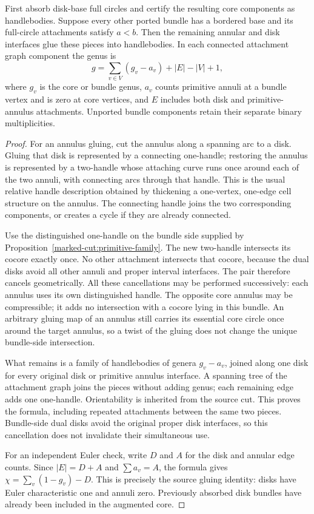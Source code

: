 \begin{proposition}
\label{marked-cut:primitive-census}
First absorb disk-base full circles and certify the resulting core
components as handlebodies. Suppose every other ported bundle has a bordered
base and its full-circle attachments satisfy $a<b$. Then the remaining
annular and disk interfaces glue these pieces into handlebodies. In each
connected attachment graph component the genus is
\[
 g=\sum_{v\in V}(g_v-a_v)+|E|-|V|+1,
\]
where $g_v$ is the core or bundle genus, $a_v$ counts primitive annuli at a
bundle vertex and is zero at core vertices, and $E$ includes both disk and
primitive-annulus attachments. Unported bundle components retain their
separate binary multiplicities.
\end{proposition}
\begin{proof}
For an annulus gluing, cut the annulus along a spanning arc to a disk.
Gluing that disk is represented by a connecting one-handle; restoring the
annulus is represented by a two-handle whose attaching curve runs once
around each of the two annuli, with connecting arcs through that handle.
This is the usual relative handle description obtained by thickening a
one-vertex, one-edge cell structure on the annulus. The connecting handle
joins the two corresponding components, or creates a cycle if they are
already connected.

Use the distinguished one-handle on the bundle side supplied by
Proposition~\ref{marked-cut:primitive-family}. The new two-handle intersects
its cocore exactly once. No other attachment intersects that cocore, because
the dual disks avoid all other annuli and proper interval interfaces.
The pair therefore cancels geometrically. All these cancellations may be
performed successively: each annulus uses its own distinguished handle.
The opposite core annulus may be compressible; it adds no intersection with
a cocore lying in this bundle. An arbitrary gluing map of an annulus still
carries its essential core circle once around the target annulus, so a twist
of the gluing does not change the unique bundle-side intersection.

What remains is a family of handlebodies of genera $g_v-a_v$, joined along
one disk for every original disk or primitive annulus interface. A spanning
tree of the attachment graph joins the pieces without adding genus; each
remaining edge adds one one-handle. Orientability is inherited from the
source cut. This proves the formula, including
repeated attachments between the same two pieces. Bundle-side dual disks
avoid the original proper disk interfaces, so this cancellation does not
invalidate their simultaneous use.

For an independent Euler check, write $D$ and $A$ for the disk and annular
edge counts. Since $|E|=D+A$ and $\sum a_v=A$, the formula gives
$\chi=\sum_v(1-g_v)-D$. This is precisely the source gluing identity:
disks have Euler characteristic one and annuli zero. Previously absorbed
disk bundles have already been included in the augmented core.
\end{proof}

